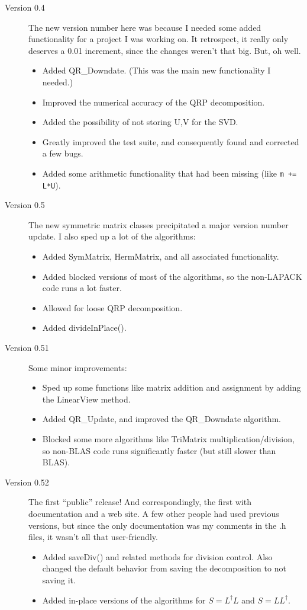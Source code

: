\documentclass[twoside,letterpaper,11pt]{article}
\renewcommand{\tt}[1]{{\lstinline {#1}}}
\begin{document}
\begin{description}
\item[Version 0.4]
The new version number here was because I needed some added functionality for a
project I was working on.  It retrospect, it really only deserves a 0.01 increment,
since the changes weren't that big.  But, oh well.
\begin{itemize}
\item
Added QR\_Downdate.  (This was the main new functionality I needed.)
\item
Improved the numerical accuracy of the QRP decomposition.
\item
Added the possibility of not storing U,V for the SVD.
\item
Greatly improved the test suite, and consequently found and corrected a few bugs.
\item
Added some arithmetic functionality that had been missing (like \tt{m += L*U}).
\end{itemize}

\item[Version 0.5]
The new symmetric matrix classes precipitated a major version number update.
I also sped up a lot of the algorithms:
\begin{itemize}
\item
Added SymMatrix, HermMatrix, and all associated functionality.
\item
Added blocked versions of most of the algorithms, so the non-LAPACK
code runs a lot faster.
\item
Allowed for loose QRP decomposition.
\item
Added divideInPlace().
\end{itemize}

\item[Version 0.51]
Some minor improvements:
\begin{itemize}
\item
Sped up some functions like matrix addition and assignment by adding the 
LinearView method.
\item
Added QR\_Update, and improved the QR\_Downdate algorithm.
\item
Blocked some more algorithms like TriMatrix multiplication/division, so non-BLAS
code runs significantly faster (but still slower than BLAS).
\end{itemize}

\item[Version 0.52]
The first ``public'' release!  And correspondingly, the first with documentation
and a web site.  A few other people had used previous versions, but since the
only documentation was my comments in the .h files, it wasn't all that user-friendly.
\begin{itemize}
\item
Added saveDiv() and related methods for division control.  Also changed the 
default behavior from saving the decomposition to not saving it.
\item
Added in-place versions of the algorithms for $S = L^\dagger L$ and $S = L L^\dagger$.
\end{itemize}


\end{description}
\end{document}
